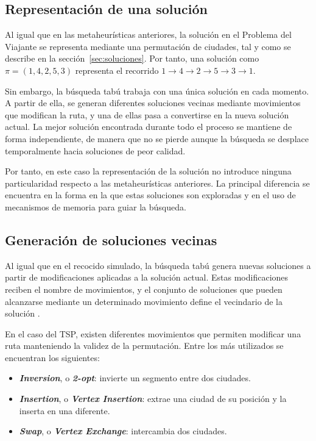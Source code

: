 \subsection{Representación de una solución}
\label{subsec:ts_rep}

Al igual que en las metaheurísticas anteriores, la solución en el Problema del Viajante se representa mediante una 
permutación de ciudades, tal y como se describe en la sección~\ref{sec:soluciones}. Por tanto, una solución como
$\pi = (1,4,2,5,3)$ representa el recorrido $1 \xrightarrow{} 4 \xrightarrow{} 2 \xrightarrow{} 5 \xrightarrow{}
3 \xrightarrow{} 1$. 

Sin embargo, la búsqueda tabú trabaja con una única solución en cada momento. A partir de ella, se generan diferentes 
soluciones vecinas mediante movimientos que modifican la ruta, y una de ellas pasa a convertirse en la nueva solución 
actual. La mejor solución encontrada durante todo el proceso se mantiene de forma independiente, de manera que no se pierde
aunque la búsqueda se desplace temporalmente hacia soluciones de peor calidad.

Por tanto, en este caso la representación de la solución no introduce ninguna particularidad respecto a las metaheurísticas
anteriores. La principal diferencia se encuentra en la forma en la que estas soluciones son exploradas y en el uso de mecanismos
de memoria para guiar la búsqueda.

\subsection{Generación de soluciones vecinas}
\label{subsec:ts_neighbour_sol_gen}

Al igual que en el recocido simulado, la búsqueda tabú genera nuevas soluciones a partir de modificaciones aplicadas a la 
solución actual. Estas modificaciones reciben el nombre de movimientos, y el conjunto de soluciones que pueden alcanzarse
mediante un determinado movimiento define el vecindario de la solución \cite{basu2012}.

En el caso del TSP, existen diferentes movimientos que permiten modificar una ruta manteniendo la validez de la
permutación. Entre los más utilizados se encuentran los siguientes:
\begin{itemize}
  \item \textbf{\textit{Inversion}}, o \textbf{\textit{2-opt}}: invierte un segmento entre dos ciudades.
  \item \textbf{\textit{Insertion}}, o \textbf{\textit{Vertex Insertion}}: extrae una ciudad de su posición y la inserta en
  una diferente.
  \item \textbf{\textit{Swap}}, o \textbf{\textit{Vertex Exchange}}: intercambia dos ciudades.
\end{itemize}

